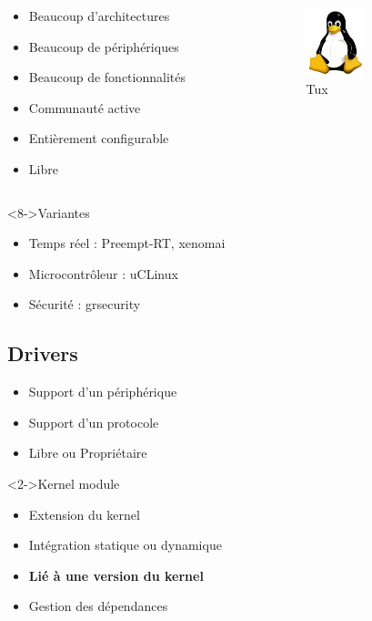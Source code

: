 \begin{frame}
	\begin{columns}[t]
		\begin{column}{0.70\textwidth}
			\begin{itemize}
				\item<2-> Beaucoup d'architectures
				\item<3-> Beaucoup de périphériques
				\item<4-> Beaucoup de fonctionnalités
				\item<5-> Communauté active
				\item<6-> Entièrement configurable
				\item<7-> Libre
			\end{itemize}
		\end{column}
		\begin{column}{0.25\textwidth}
			\begin{figure}
				\includegraphics[height=2cm]{img/tux.png}
				\caption{Tux}
			\end{figure}
		\end{column}
	\end{columns}
	\begin{block}<8->{Variantes}
		\begin{itemize}
			\item<8-> Temps réel : Preempt-RT, xenomai
			\item<9-> Microcontrôleur : uCLinux
			\item<10-> Sécurité : grsecurity
		\end{itemize}
	\end{block}
\end{frame}
\subsection{Drivers}
\begin{frame}
	\begin{itemize}
		\item Support d'un périphérique
		\item Support d'un protocole
		\item Libre ou Propriétaire
	\end{itemize}
	\begin{block}<2->{Kernel module}
		\begin{itemize}
		\item Extension du kernel
		\item Intégration statique ou dynamique
		\item \textbf{Lié à une version du kernel}
		\item Gestion des dépendances
		\end{itemize}
	\end{block}
\end{frame}
